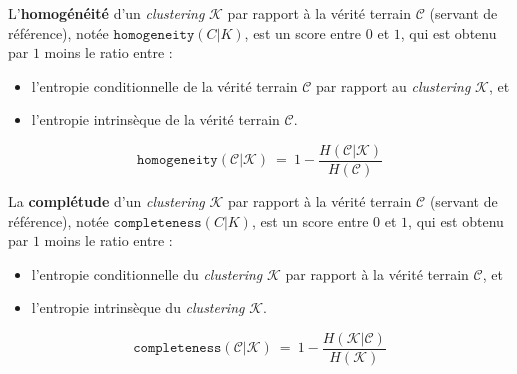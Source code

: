 		\newpage
		L'\textbf{homogénéité} d'un \textit{clustering} $\mathcal{K}$ par rapport à la vérité terrain $\mathcal{C}$ (servant de référence), notée $\texttt{homogeneity}(C|K)$, est un score entre $0$ et $1$, qui est obtenu par $1$ moins le ratio entre :
		\begin{itemize}
			\item l'entropie conditionnelle de la vérité terrain $\mathcal{C}$ par rapport au \textit{clustering} $\mathcal{K}$, et
			\item l'entropie intrinsèque de la vérité terrain $\mathcal{C}$.
		\end{itemize}
		
		\begin{equation}
			\label{equation:D.1-ANNEXE-EVALUATION-CLUSTERING-DEFINITION-HOMEGENEITE}
			\texttt{homogeneity}(\mathcal{C}|\mathcal{K})~=~
				1
				-
				\frac{
					H(\mathcal{C}|\mathcal{K})
				}{
					H(\mathcal{C})
				}
		\end{equation}
		
		La \textbf{complétude} d'un \textit{clustering} $\mathcal{K}$ par rapport à la vérité terrain $\mathcal{C}$ (servant de référence), notée $\texttt{completeness}(C|K)$, est un score entre $0$ et $1$, qui est obtenu par $1$ moins le ratio entre :
		\begin{itemize}
			\item l'entropie conditionnelle du \textit{clustering} $\mathcal{K}$ par rapport à la vérité terrain $\mathcal{C}$, et
			\item l'entropie intrinsèque du \textit{clustering} $\mathcal{K}$.
		\end{itemize}
		
		\begin{equation}
			\label{equation:D.1-ANNEXE-EVALUATION-CLUSTERING-DEFINITION-COMPLETENESS}
			\texttt{completeness}(\mathcal{C}|\mathcal{K})~=~
				1
				-
				\frac{
					H(\mathcal{K}|\mathcal{C})
				}{
					H(\mathcal{K})
				}
		\end{equation}
		
